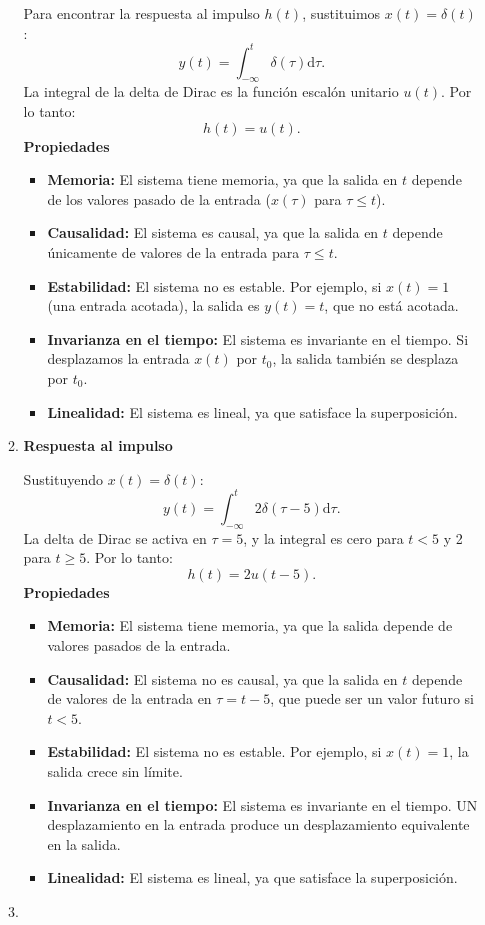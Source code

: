 \begin{enumerate}[label=\color{red}\textbf{\arabic*)}]
\begin{enumerate}[label=\color{red}\textbf{\alph*)}]
        Para encontrar la respuesta al impulso $h(t)$, sustituimos  $x(t)=\delta(t)$:  \[
        y(t)=\int_{-\infty}^{t} \delta(\tau) \mathrm{d}\tau.
        \] 
        La integral de la delta de Dirac es la función escalón unitario $u(t)$. Por lo tanto:  \[
        h(t)=u(t).
        \] 
        \textbf{Propiedades}
        \begin{itemize}[label=\textbullet]
            \item \textbf{Memoria:} El sistema tiene memoria, ya que la salida en $t$ depende de los valores pasado de la entrada ($x(\tau)$ para $\tau\le t$).
            \item \textbf{Causalidad:} El sistema es causal, ya que la salida en $t$ depende únicamente de valores de la entrada para  $\tau\le t$.
            \item \textbf{Estabilidad:} El sistema no es estable. Por ejemplo, si $x(t)=1$ (una entrada acotada), la salida es  $y(t)=t$, que no está acotada.
            \item \textbf{Invarianza en el tiempo:} El sistema es invariante en el tiempo. Si desplazamos la entrada $x(t)$ por  $t_0$, la salida también se desplaza por $t_0$.
            \item \textbf{Linealidad:} El sistema es lineal, ya que satisface la superposición.
        \end{itemize}
    \item {} 

        \textbf{Respuesta al impulso}

        Sustituyendo $x(t)=\delta(t)$:  \[
        y(t)=\int_{-\infty}^{t}  2\delta(\tau-5)\mathrm{d}\tau.
        \] 
        La delta de Dirac se activa en $\tau=5$, y la integral es cero para  $t<5$ y 2 para  $t\ge 5$. Por lo tanto: \[
        h(t)=2u(t-5).
        \] 
        \textbf{Propiedades}
        \begin{itemize}[label=\textbullet]
            \item \textbf{Memoria:} El sistema tiene memoria, ya que la salida depende de valores pasados de la entrada.
            \item \textbf{Causalidad:} El sistema no es causal, ya que la salida en $t$ depende de valores de la entrada en $\tau=t-5$, que puede ser un valor futuro si  $t<5$.
            \item \textbf{Estabilidad:} El sistema no es estable. Por ejemplo, si $x(t)=1$, la salida crece sin límite.
            \item \textbf{Invarianza en el tiempo:} El sistema es invariante en el tiempo. UN desplazamiento en la entrada produce un desplazamiento equivalente en la salida.
            \item \textbf{Linealidad:} El sistema es lineal, ya que satisface la superposición.
        \end{itemize}
    \item {} 
       

\end{enumerate}
\end{enumerate}
